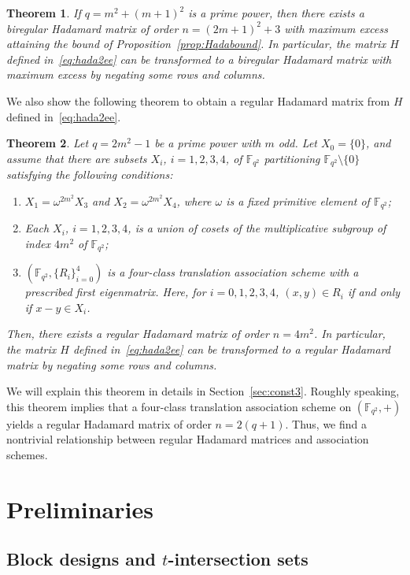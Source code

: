 \documentclass[10pt]{amsart}
\newtheorem{theo}{Theorem}[section]
\theoremstyle{definition}
\newcommand*\F{{\mathbb F}}
\begin{document}
\begin{theo}\label{thm:main2}
If $q=m^2+(m+1)^2$ is a prime power, then there exists a biregular Hadamard matrix of order $n=(2m+1)^2+3$ with maximum excess attaining the bound of Proposition~\ref{prop:Hadabound}. In particular, the matrix $H$ defined in~\eqref{eq:hada2ee} can be transformed to a biregular Hadamard matrix with maximum excess by negating some rows and columns.
\end{theo}

We also show the following theorem to obtain a regular Hadamard matrix from $H $ defined in~\eqref{eq:hada2ee}.

\begin{theo}\label{thm:main3tr}
Let $q=2m^2-1$ be a prime power with $m$ odd. Let $X_0=\{0\}$, and assume that there are subsets $X_i$, $i=1,2,3,4$, of $\F_{q^2}$ partitioning $\F_{q^2}\setminus \{0\}$ satisfying the following conditions:
\begin{enumerate}
\item $X_1=\omega^{2m^2}X_3$ and $X_2=\omega^{2m^2}X_4$, where $\omega$ is a fixed primitive element of $\F_{q^2}$;
\item Each $X_i$, $i=1,2,3,4$, is a union of cosets of the multiplicative subgroup of index $4m^2$ of $\F_{q^2}$;
\item $(\F_{q^2},\{R_i\}_{i=0}^4)$ is a four-class translation association scheme with a prescribed first eigenmatrix. Here, for $i=0,1,2,3,4$, $(x,y)\in R_i$ if and only if $x-y \in X_i$.
\end{enumerate}
Then, there exists a regular Hadamard matrix of order $n=4m^2$. In particular, the matrix $H$ defined in~\eqref{eq:hada2ee} can be transformed to a regular Hadamard matrix by negating some rows and columns.
\end{theo}

We will explain this theorem in details in Section~\ref{sec:const3}. Roughly speaking, this theorem implies that a four-class translation association scheme on $(\F_{q^2},+)$ yields a regular Hadamard matrix of order $n=2(q+1)$. Thus, we find a nontrivial relationship between regular Hadamard matrices and association schemes.


\section{Preliminaries}

\subsection{Block designs and \texorpdfstring{$t$}{t}-intersection sets}
\end{document}
